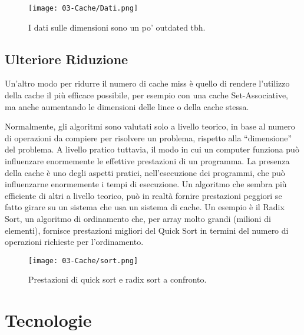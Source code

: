 \begin{figure}[!h]
    \centering
    \texttt{[image: 03-Cache/Dati.png]}
    \caption{I dati sulle dimensioni sono un po' outdated tbh.}
\end{figure}

\subsection{Ulteriore Riduzione}

Un'altro modo per ridurre il numero di cache miss è quello di rendere l'utilizzo della cache il più efficace possibile, per esempio con una cache Set-Associative, ma anche aumentando le dimensioni delle linee o della cache stessa. 

Normalmente, gli algoritmi sono valutati solo a livello teorico, in
base al numero di operazioni da compiere per risolvere un problema,
rispetto alla “dimensione” del problema. A livello pratico tuttavia, il modo in cui un computer funziona può
influenzare enormemente le effettive prestazioni di un programma. La presenza della cache è uno degli aspetti pratici, nell’esecuzione
dei programmi, che può influenzarne enormemente i tempi di
esecuzione. Un algoritmo che sembra più efficiente di altri a livello teorico,
può in realtà fornire prestazioni peggiori se fatto girare su un sistema
che usa un sistema di cache.
Un esempio è il Radix Sort, un algoritmo di ordinamento che,
per array molto grandi (milioni di elementi), fornisce prestazioni
migliori del Quick Sort in termini del numero di operazioni
richieste per l’ordinamento.

\begin{figure}[!h]
    \centering
    \texttt{[image: 03-Cache/sort.png]}
    \caption{Prestazioni di quick sort e radix sort a confronto.}
\end{figure}


\section{Tecnologie}



